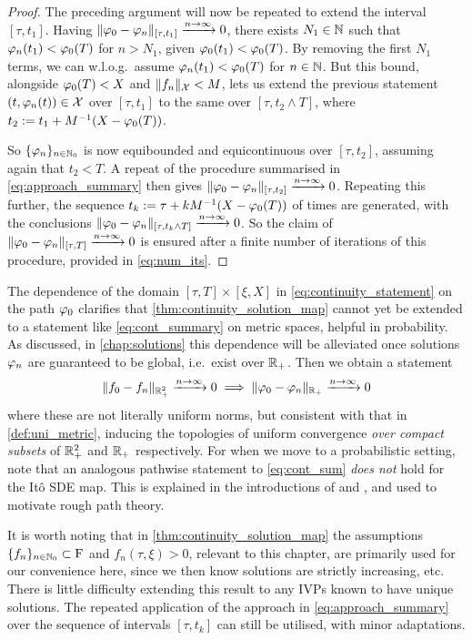 \begin{proof}
    The preceding argument will now be repeated to extend the interval $[\tau,t_1]$. Having $\Vert \varphi_0 - \varphi_n\Vert_{[\tau,t_1]} \xrightarrow{n\to\infty}0$, there exists $N_1\in\mathbb{N}$ such that $\varphi_n(t_1)<\varphi_0(T)$ for $n>N_1$, given $\varphi_0(t_1)<\varphi_0(T)$. By removing the first $N_1$ terms, we can w.l.o.g.~assume $\varphi_n(t_1)<\varphi_0(T)$ for $n\in\mathbb{N}$. But this bound, alongside $\varphi_0(T)<X$ and $\Vert f_n\Vert_{\mathcal{X}}< M$, lets us extend the previous statement $(t,\varphi_n(t))\in\mathcal{X}$ over $[\tau,t_1]$ to the same over $[\tau,t_2\wedge T]$, where $t_2:=t_1 + M^{-1}(X-\varphi_0(T))$.

    So $\{\varphi_n\}_{n\in\mathbb{N}_0}$ is now equibounded and equicontinuous over $[\tau,t_2]$, assuming again that $t_2<T$. A repeat of the procedure summarised in \autoref{eq:approach_summary} then gives $\Vert \varphi_0 - \varphi_n\Vert_{[\tau,t_2]} \xrightarrow{n\to\infty}0$. Repeating this further, the sequence $t_k:=\tau + kM^{-1}(X-\varphi_0(T))$ of times are generated, with the conclusions $\Vert \varphi_0 - \varphi_n\Vert_{[\tau,t_k\wedge T]} \xrightarrow{n\to\infty}0$. So the claim of $\Vert \varphi_0 - \varphi_n\Vert_{[\tau, T]} \xrightarrow{n\to\infty}0$ is ensured after a finite number of iterations of this procedure, provided in \autoref{eq:num_its}.
\end{proof}

The dependence of the domain $[\tau,T]\times[\xi,X]$ in \autoref{eq:continuity_statement} on the path $\varphi_0$ clarifies that \autoref{thm:continuity_solution_map} cannot yet be extended to a statement like \autoref{eq:cont_summary} on metric spaces, helpful in probability. As discussed, in \autoref{chap:solutions} this dependence will be alleviated once solutions $\varphi_n$ are guaranteed to be global, i.e.~exist over $\mathbb{R}_+$. Then we obtain a statement
\begin{equation}\label{eq:cont_sum}
    \Vert f_0 - f_n \Vert_{\mathbb{R}_+^2} \xrightarrow{n\to\infty}0 \implies \Vert \varphi_0 - \varphi_n\Vert_{\mathbb{R}_+} \xrightarrow{n\to\infty}0
\end{equation}
where these are not literally uniform norms, but consistent with that in  \autoref{def:uni_metric}, inducing the topologies of uniform convergence \emph{over compact subsets} of $\mathbb{R}_+^2$ and $\mathbb{R}_+$ respectively. For when we move to a probabilistic setting, note that an analogous pathwise statement to \autoref{eq:cont_sum} \emph{does not} hold for the It\^o SDE map. This is explained in the introductions of \cite{friz_2010} and \cite{friz_2014}, and used to motivate rough path theory.

It is worth noting that in \autoref{thm:continuity_solution_map} the assumptions $\{f_n\}_{n\in\mathbb{N}_0}\subset\mathrm{F}$ and $f_n(\tau,\xi)>0$, relevant to this chapter, are primarily used for our convenience here, since we then know solutions are strictly increasing, etc. There is little difficulty extending this result to any IVPs known to have unique solutions. The repeated application of the approach in \autoref{eq:approach_summary} over the sequence of intervals $[\tau,t_k]$ can still be utilised, with minor adaptations.

